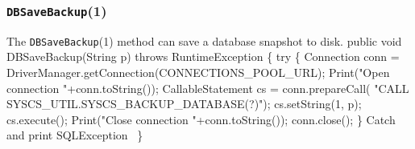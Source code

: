 \documentclass{article}
\def\nwendcode{\endtrivlist \endgroup}      %
\let\nwdocspar=\par
\theoremstyle{definition}                   %
\begin{document}
\subsubsection{{\tt{}\protect{}\protect{}DBSaveBackup}(1)}
The {\tt{}\protect{}DBSaveBackup}(1) method can save a database snapshot to disk.
\nwenddocs{}\endmoddef{}
public void DBSaveBackup(String p) throws RuntimeException \{
  try \{
    Connection conn = DriverManager.getConnection(CONNECTIONS_POOL_URL);
    Print("Open connection "+conn.toString());
    CallableStatement cs = conn.prepareCall(
      "CALL SYSCS_UTIL.SYSCS_BACKUP_DATABASE(?)");
    cs.setString(1, p);
    cs.execute();
    Print("Close connection "+conn.toString());
    conn.close();
  \}
  \LA{}Catch and print \code{}SQLException\edoc{}~{\nwtagstyle{}}\RA{}
\}
\eatline
{}\nwendcode{}\nwdocspar
\end{document}
